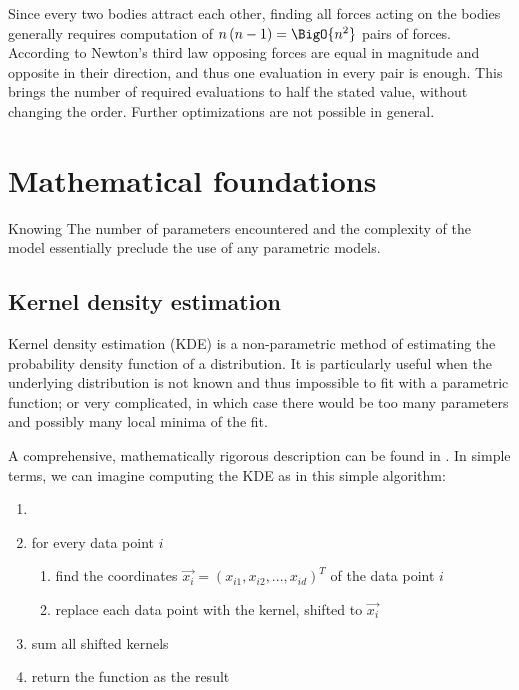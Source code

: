         Since every two bodies attract each other, finding all forces acting on the bodies generally
        requires computation of $n\left(n - 1\right) = \BigO{n^2}$ pairs of forces.
        According to Newton's third law opposing forces are equal in magnitude and opposite in their direction,
        and thus one evaluation in every pair is enough.
        This brings the number of required evaluations to half the stated value, without changing the order.
        Further optimizations are not possible in general.

\section{Mathematical foundations} \label{mm}
    Knowing 
    The number of parameters encountered and the complexity of the model essentially preclude the use of any parametric models.

    \subsection{Kernel density estimation} \label{mmk}
        Kernel density estimation (KDE) is a non-parametric method of estimating the probability density function
        of a distribution. It is particularly useful when the underlying distribution is not known and thus impossible
        to fit with a parametric function; or very complicated, in which case there would be too many parameters
        and possibly many local minima of the fit.

        A comprehensive, mathematically rigorous description can be found in \citep{hwang+1994}.
        In simple terms, we can imagine computing the KDE as in this simple algorithm:
        \begin{enumerate}
            \item 
            \item for every data point $i$
                \begin{enumerate}[label=\arabic*.]
                \item find the coordinates $\vec{x_i} = (x_{i1}, x_{i2}, ..., x_{id})^T$ of the data point $i$
                \item replace each data point with the kernel, shifted to $\vec{x_i}$
            \end{enumerate}
            \item sum all shifted kernels
            \item return the function as the result
        \end{enumerate}

